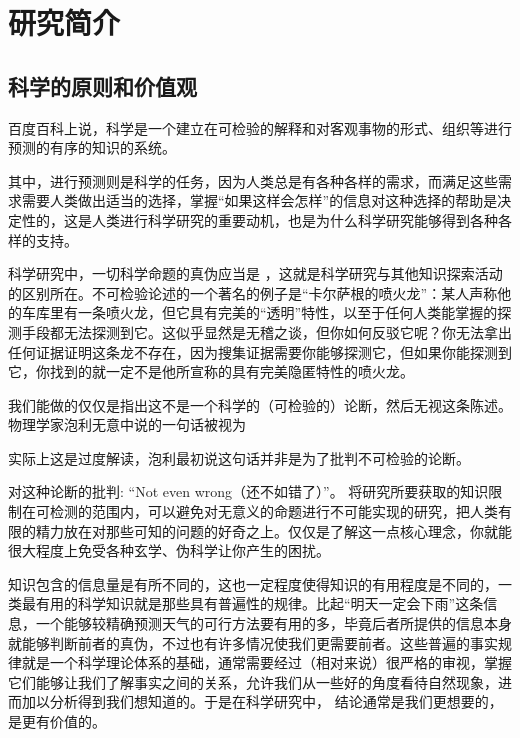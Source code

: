 \documentclass[a4paper,10pt,english]{sphinxmanual}
\begin{document}
\chapter{研究简介}
\label{\detokenize{3. Intro_Research:id1}}\label{\detokenize{3. Intro_Research::doc}}

\section{科学的原则和价值观}
\label{\detokenize{3. Intro_Research:id2}}
百度百科上说，科学是一个建立在可检验的解释和对客观事物的形式、组织等进行预测的有序的知识的系统。

其中，进行预测则是科学的任务，因为人类总是有各种各样的需求，而满足这些需求需要人类做出适当的选择，掌握“如果这样会怎样”的信息对这种选择的帮助是决定性的，这是人类进行科学研究的重要动机，也是为什么科学研究能够得到各种各样的支持。

科学研究中，一切科学命题的真伪应当是  ，这就是科学研究与其他知识探索活动的区别所在。不可检验论述的一个著名的例子是“卡尔萨根的喷火龙”：某人声称他的车库里有一条喷火龙，但它具有完美的“透明”特性，以至于任何人类能掌握的探测手段都无法探测到它。这似乎显然是无稽之谈，但你如何反驳它呢？你无法拿出任何证据证明这条龙不存在，因为搜集证据需要你能够探测它，但如果你能探测到它，你找到的就一定不是他所宣称的具有完美隐匿特性的喷火龙。

我们能做的仅仅是指出这不是一个科学的（可检验的）论断，然后无视这条陈述。物理学家泡利无意中说的一句话被视为 %
\begin{footnote}[1]\sphinxAtStartFootnote
实际上这是过度解读，泡利最初说这句话并非是为了批判不可检验的论断。
%
\end{footnote} 对这种论断的批判: “Not even wrong（还不如错了）”。 将研究所要获取的知识限制在可检测的范围内，可以避免对无意义的命题进行不可能实现的研究，把人类有限的精力放在对那些可知的问题的好奇之上。仅仅是了解这一点核心理念，你就能很大程度上免受各种玄学、伪科学让你产生的困扰。

知识包含的信息量是有所不同的，这也一定程度使得知识的有用程度是不同的，一类最有用的科学知识就是那些具有普遍性的规律。比起“明天一定会下雨”这条信息，一个能够较精确预测天气的可行方法要有用的多，毕竟后者所提供的信息本身就能够判断前者的真伪，不过也有许多情况使我们更需要前者。这些普遍的事实规律就是一个科学理论体系的基础，通常需要经过（相对来说）很严格的审视，掌握它们能够让我们了解事实之间的关系，允许我们从一些好的角度看待自然现象，进而加以分析得到我们想知道的。于是在科学研究中，  结论通常是我们更想要的，是更有价值的。
\end{document}
